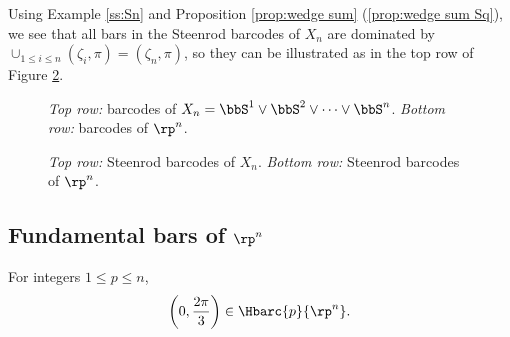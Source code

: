 \subsubsection{} Using Example \ref{ss:Sn} and Proposition \ref{prop:wedge sum} (\ref{prop:wedge sum Sq}), we see that all bars in the Steenrod barcodes of $X_n$ are dominated by $\cup_{1\leq i\leq n}(\zeta_i,\pi)=(\zeta_n,\pi)$, so they can be illustrated as in the top row of Figure \ref{fig:sq barcodes}.

\begin{figure}
	\centering
	
	\caption{\emph{Top row:} barcodes of $X_n = \bbS^1\vee\bbS^2\vee\dots\vee\bbS^n$. \emph{Bottom row:} barcodes of $\rp^n$. }
	\label{fig:barcodes}
\end{figure}

\begin{figure}
	\centering
	
	\caption{\emph{Top row:} Steenrod barcodes of $X_n$. \emph{Bottom row:} Steenrod barcodes of $\rp^n$.}
	\label{fig:sq barcodes}
\end{figure}


\subsection{Fundamental bars of $\rp^n$}

\begin{lemma}\label{prop:RPn bar}
	For integers $1 \leq p \leq n$,
	\[
	\left(0, \frac{2\pi}{3}\right) \in \Hbarc{p}{\rp^n}.
	\]
\end{lemma}

